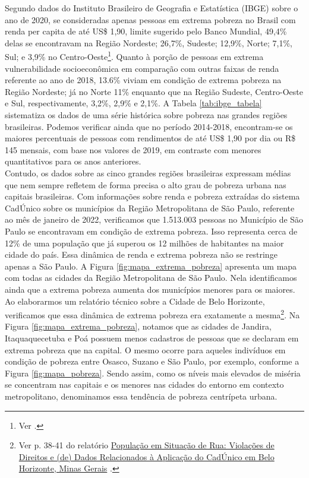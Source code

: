 \documentclass[14pt]{extarticle}
\begin{document}
Segundo dados do Instituto Brasileiro de Geografia e Estatística (IBGE) sobre o ano de 2020, se consideradas apenas pessoas em extrema pobreza no Brasil com renda per capita de até US\$ 1,90, limite sugerido pelo Banco Mundial, 49,4\% delas se encontravam na Região Nordeste; 26,7\%, Sudeste; 12,9\%, Norte; 7,1\%, Sul; e 3,9\% no Centro-Oeste\footnote{Ver \href{https://biblioteca.ibge.gov.br/visualizacao/livros/liv101892.pdf}{\citep[p. 63]{ibge1}}.}. Quanto à porção de pessoas em extrema vulnerabilidade socioeconômica em comparação com outras faixas de renda referente ao ano de 2018, 13.6\% viviam em condição de extrema pobreza na Região Nordeste; já no Norte 11\% enquanto que na Região Sudeste, Centro-Oeste e Sul, respectivamente, 3,2\%, 2,9\% e 2,1\%.  A Tabela \ref{tab:ibge_tabela} sistematiza os dados de uma série histórica sobre pobreza nas grandes regiões brasileiras. Podemos verificar ainda que no período 2014-2018, encontram-se os maiores percentuais de pessoas com rendimentos de até US\$ 1,90 por dia ou R\$ 145 mensais, com base nos valores de 2019, em contraste com menores quantitativos para os anos anteriores.\\

Contudo, os dados sobre as cinco grandes regiões brasileiras expressam médias que nem sempre refletem de forma precisa o alto grau de pobreza urbana nas capitais brasileiras. Com informações sobre renda e pobreza extraídas do sistema CadÚnico sobre os municípios da Região Metropolitana de São Paulo, referente ao mês de janeiro de 2022, verificamos que 1.513.003 pessoas no Município de São Paulo se encontravam em condição de extrema pobreza. Isso representa cerca de 12\% de uma população que já superou os 12 milhões de habitantes na maior cidade do país. Essa dinâmica de renda e extrema pobreza não se restringe apenas a São Paulo. A Figura \ref{fig:mapa_extrema_pobreza} apresenta um mapa com todas as cidades da Região Metropolitana de São Paulo. Nela identificamos ainda que a extrema pobreza aumenta dos municípios menores para os maiores.\\

Ao elaborarmos um relatório técnico sobre a Cidade de Belo Horizonte, verificamos que essa dinâmica de extrema pobreza era exatamente a mesma\footnote{Ver p. 38-41 do relatório \href{https://polos.direito.ufmg.br/wp-content/uploads/2021/09/Nota-Tecnica-inedita-elaborada-pelo-Programa-Polos-de-Cidadania-da-UFMG-sobre-o-CadUnico-em-Belo-Horizonte.pdf}{População em Situação de Rua: Violações de Direitos e (de) Dados Relacionados à Aplicação do CadÚnico em Belo Horizonte, Minas Gerais} \citep{polos1}.}. Na Figura \ref{fig:mapa_extrema_pobreza}, notamos que as cidades de Jandira, Itaquaquecetuba e Poá possuem menos cadastros de pessoas que se declaram em extrema pobreza que na capital. O mesmo ocorre para aqueles indivíduos em condição de pobreza entre Osasco, Suzano e São Paulo, por exemplo, conforme a Figura \ref{fig:mapa_pobreza}. Sendo assim, como os níveis mais elevados de miséria se concentram nas capitais e os menores nas cidades do entorno em contexto metropolitano, denominamos essa tendência de pobreza centrípeta urbana.\\ 
\end{document}
